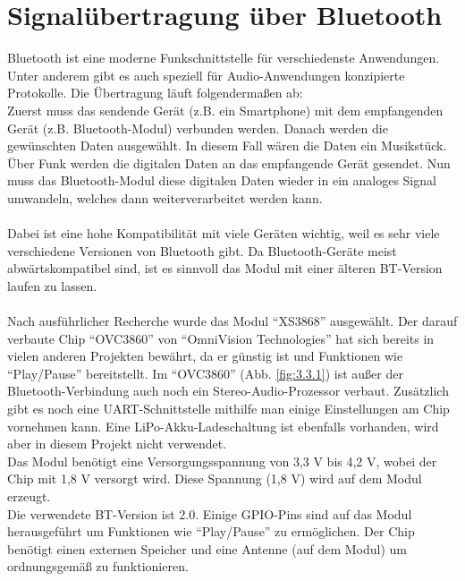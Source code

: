 \section{Signalübertragung über Bluetooth}\label{sec:3.3}
Bluetooth ist eine moderne Funkschnittstelle für verschiedenste Anwendungen.
Unter anderem gibt es auch speziell für Audio-Anwendungen konzipierte Protokolle.
Die Übertragung läuft folgendermaßen ab:
\\
Zuerst muss das sendende Gerät (z.B. ein Smartphone) mit dem empfangenden Gerät (z.B. Bluetooth-Modul) verbunden werden.
Danach werden die gewünschten Daten ausgewählt.
In diesem Fall wären die Daten ein Musikstück.
Über Funk werden die digitalen Daten an das empfangende Gerät gesendet.
Nun muss das Bluetooth-Modul diese digitalen Daten wieder in ein analoges Signal umwandeln, welches dann weiterverarbeitet werden kann.
\\ \\
Dabei ist eine hohe Kompatibilität mit viele Geräten wichtig, weil es sehr viele verschiedene Versionen von Bluetooth gibt.
Da Bluetooth-Geräte meist abwärtskompatibel sind, ist es sinnvoll das Modul mit einer älteren BT-Version laufen zu lassen.
\\ \\
Nach ausführlicher Recherche wurde das Modul \enquote{XS3868} ausgewählt.
Der darauf verbaute Chip \enquote{OVC3860} von \enquote{OmniVision Technologies} hat sich bereits in vielen anderen Projekten bewährt, da er günstig ist und Funktionen wie \enquote{Play/Pause} bereitstellt.
\newpage
Im \enquote{OVC3860} (Abb. \ref {fig:3.3.1}) ist außer der Bluetooth-Verbindung auch noch ein Stereo-Audio-Prozessor verbaut.
Zusätzlich gibt es noch eine UART-Schnittstelle mithilfe man einige Einstellungen am Chip vornehmen kann.
Eine LiPo-Akku-Ladeschaltung ist ebenfalls vorhanden, wird aber in diesem Projekt nicht verwendet.
\\
Das Modul benötigt eine Versorgungsspannung von 3,3 V bis 4,2 V, wobei der Chip mit 1,8 V versorgt wird.
Diese Spannung (1,8 V) wird auf dem Modul erzeugt.
\\
Die verwendete BT-Version ist 2.0.
Einige GPIO-Pins sind auf das Modul herausgeführt um Funktionen wie \enquote{Play/Pause} zu ermöglichen.
Der Chip benötigt einen externen Speicher und eine Antenne (auf dem Modul) um ordnungsgemäß zu funktionieren.
